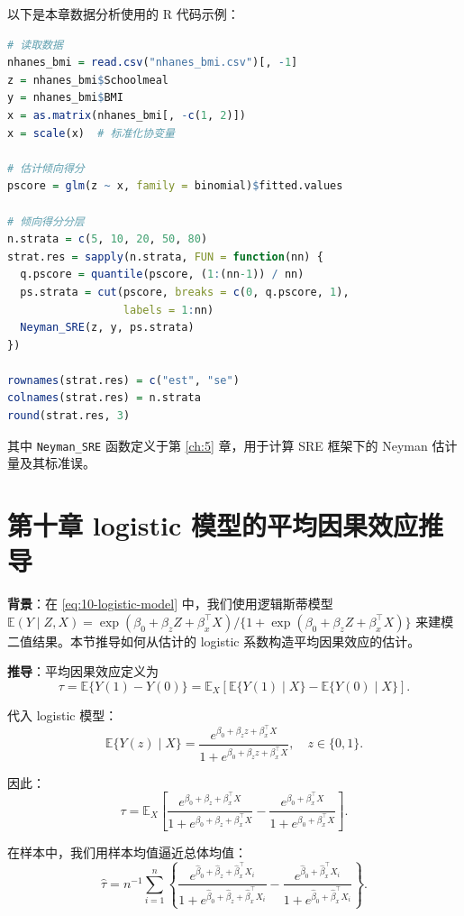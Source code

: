 以下是本章数据分析使用的 R 代码示例：

\begin{lstlisting}[language=R]
# 读取数据
nhanes_bmi = read.csv("nhanes_bmi.csv")[, -1]
z = nhanes_bmi$Schoolmeal
y = nhanes_bmi$BMI
x = as.matrix(nhanes_bmi[, -c(1, 2)])
x = scale(x)  # 标准化协变量

# 估计倾向得分
pscore = glm(z ~ x, family = binomial)$fitted.values

# 倾向得分分层
n.strata = c(5, 10, 20, 50, 80)
strat.res = sapply(n.strata, FUN = function(nn) {
  q.pscore = quantile(pscore, (1:(nn-1)) / nn)
  ps.strata = cut(pscore, breaks = c(0, q.pscore, 1),
                  labels = 1:nn)
  Neyman_SRE(z, y, ps.strata)
})

rownames(strat.res) = c("est", "se")
colnames(strat.res) = n.strata
round(strat.res, 3)
\end{lstlisting}

其中 \texttt{Neyman\_SRE} 函数定义于第 \ref{ch:5} 章，用于计算 SRE 框架下的 Neyman 估计量及其标准误。

\section{第十章 logistic 模型的平均因果效应推导}\label{sec:appendix-10-logistic-derivation}

\textbf{背景}：在 \cref{eq:10-logistic-model} 中，我们使用逻辑斯蒂模型 $\mathbb{E}(Y \mid Z, X) = \exp(\beta_0 + \beta_z Z + \beta_x^\top X) / \{1 + \exp(\beta_0 + \beta_z Z + \beta_x^\top X)\}$ 来建模二值结果。本节推导如何从估计的 logistic 系数构造平均因果效应的估计。

\textbf{推导}：平均因果效应定义为
\[
\tau = \mathbb{E}\{Y(1) - Y(0)\} = \mathbb{E}_X[\mathbb{E}\{Y(1) \mid X\} - \mathbb{E}\{Y(0) \mid X\}] .
\]

代入 logistic 模型：
\[
\mathbb{E}\{Y(z) \mid X\} = \frac{e^{\beta_0 + \beta_z z + \beta_x^\top X}}{1 + e^{\beta_0 + \beta_z z + \beta_x^\top X}}, \quad z \in \{0, 1\}.
\]

因此：
\[
\tau = \mathbb{E}_X\left[ \frac{e^{\beta_0 + \beta_z + \beta_x^\top X}}{1 + e^{\beta_0 + \beta_z + \beta_x^\top X}} - \frac{e^{\beta_0 + \beta_x^\top X}}{1 + e^{\beta_0 + \beta_x^\top X}} \right].
\]

在样本中，我们用样本均值逼近总体均值：
\[
\hat{\tau} = n^{-1} \sum_{i=1}^n \left\{ \frac{e^{\hat\beta_0 + \hat\beta_z + \hat\beta_x^\top X_i}}{1 + e^{\hat\beta_0 + \hat\beta_z + \hat\beta_x^\top X_i}} - \frac{e^{\hat\beta_0 + \hat\beta_x^\top X_i}}{1 + e^{\hat\beta_0 + \hat\beta_x^\top X_i}} \right\}.
\]

